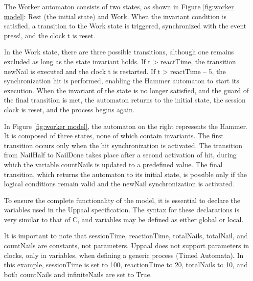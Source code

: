 

The Worker automaton consists of two states, as shown in Figure \ref{fig:worker model}: Rest (the initial state) and Work. When the invariant condition is satisfied, a transition to the Work state is triggered, synchronized with the event press!, and the clock t is reset.

In the Work state, there are three possible transitions, although one remains excluded as long as the state invariant holds. If t > reactTime, the transition newNail is executed and the clock t is restarted. If t > reactTime – 5, the synchronization hit is performed, enabling the Hammer automaton to start its execution. When the invariant of the state is no longer satisfied, and the guard of the final transition is met, the automaton returns to the initial state, the session clock is reset, and the process begins again.

In Figure \ref{fig:worker model}, the automaton on the right represents the Hammer. It is composed of three states, none of which contain invariants. The first transition occurs only when the hit synchronization is activated. The transition from NailHalf to NailDone takes place after a second activation of hit, during which the variable countNails is updated to a predefined value. The final transition, which returns the automaton to its initial state, is possible only if the logical conditions remain valid and the newNail synchronization is activated.

To ensure the complete functionality of the model, it is essential to declare the variables used in the Uppaal specification. The syntax for these declarations is very similar to that of C, and variables may be defined as either global or local.

It is important to note that sessionTime, reactionTime, totalNails, totalNail, and countNails are constants, not parameters. Uppaal does not support parameters in clocks, only in variables, when defining a generic process (Timed Automata). In this example, sessionTime is set to 100, reactionTime to 20, totalNails to 10, and both countNails and infiniteNails are set to True.


